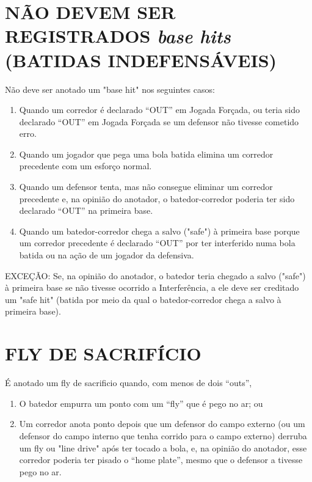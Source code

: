 \section[Bat Indefens\'aveis]{NÃO DEVEM SER REGISTRADOS \textit{base hits} (BATIDAS INDEFENSÁVEIS) }
\begin{multicols}{2} 
	Não deve ser anotado um "base hit" nos seguintes casos: 
	
	\begin{enumerate}[label=\alph*)]
		\item Quando um corredor é declarado “OUT” em Jogada Forçada, ou teria sido declarado 
		“OUT” em Jogada Forçada se um defensor não tivesse cometido erro. 
		
		\item  Quando um jogador que pega uma bola batida elimina um corredor precedente com 
		um esforço normal. 
		
		\item  Quando um defensor tenta, mas não consegue eliminar um corredor precedente e, 
		na opinião do anotador, o batedor-corredor poderia ter sido declarado “OUT” na 
		primeira base. 
		
		\item  Quando um batedor-corredor chega a salvo ("safe") à primeira base porque um 
		corredor precedente é declarado “OUT” por ter interferido numa bola batida ou na 
		ação de um jogador da defensiva. 
	\end{enumerate}
	EXCEÇÃO: Se, na opinião do anotador, o batedor teria chegado a salvo ("safe") à 
	primeira base se não tivesse ocorrido a Interferência, a ele deve ser creditado um "safe 
	hit" (batida por meio da qual o batedor-corredor chega a salvo à primeira base). 
\end{multicols}

\section{FLY DE SACRIFÍCIO }
\begin{multicols}{2}
	É anotado um \gls{fly de sacrificio} quando, com menos de dois “outs”, 
	
	\begin{enumerate}[label=\alph*)]
		\item O batedor empurra um ponto com um “fly” que é pego no ar; ou 
		
		\item  Um corredor anota ponto depois que um defensor do campo externo (ou um 
		defensor do campo interno que tenha corrido para o campo externo) derruba um \gls{fly} 
		ou "line drive" após ter tocado a bola, e, na opinião do anotador, esse corredor 
		poderia ter pisado o “home plate”, mesmo que o defensor a tivesse pego no ar. 
	\end{enumerate}
\end{multicols}
